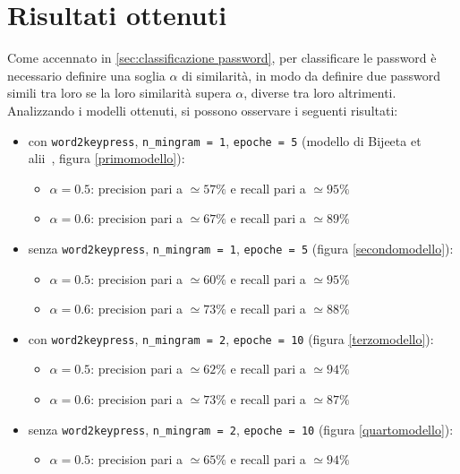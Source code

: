 \section{Risultati ottenuti}
\label{sec:risultati ottenuti}
Come accennato in \ref{sec:classificazione password}, per classificare le password è necessario definire una soglia $\alpha$ di similarità, in modo da definire due password simili tra loro se la loro similarità supera $\alpha$, diverse tra loro altrimenti.
Analizzando i modelli ottenuti, si possono osservare i seguenti risultati:
\begin{itemize}
    \item con \texttt{word2keypress}, \texttt{n\_mingram = 1}, \texttt{epoche = 5} (modello di Bijeeta et
    \\alii~\cite{bijeeta}, figura \ref{primomodello}):
    \begin{itemize}
        \item $\alpha = 0.5$: precision pari a $\simeq 57\%$ e recall pari a $\simeq 95\%$
        \item $\alpha = 0.6$: precision pari a $\simeq 67\%$ e recall pari a $\simeq 89\%$
    \end{itemize}
    \item senza \texttt{word2keypress}, \texttt{n\_mingram = 1}, \texttt{epoche = 5} (figura \ref{secondomodello}):
    \begin{itemize}
        \item $\alpha = 0.5$: precision pari a $\simeq 60\%$ e recall pari a $\simeq 95\%$
        \item $\alpha = 0.6$: precision pari a $\simeq 73\%$ e recall pari a $\simeq 88\%$
    \end{itemize}
    \item con \texttt{word2keypress}, \texttt{n\_mingram = 2}, \texttt{epoche = 10} (figura \ref{terzomodello}):
    \begin{itemize}
        \item $\alpha = 0.5$: precision pari a $\simeq 62\%$ e recall pari a $\simeq 94\%$
        \item $\alpha = 0.6$: precision pari a $\simeq 73\%$ e recall pari a $\simeq 87\%$
    \end{itemize}
    \item senza \texttt{word2keypress}, \texttt{n\_mingram = 2}, \texttt{epoche = 10} (figura \ref{quartomodello}):
    \begin{itemize}
        \item $\alpha = 0.5$: precision pari a $\simeq 65\%$ e recall pari a $\simeq 94\%$

\end{itemize}
\end{itemize}
